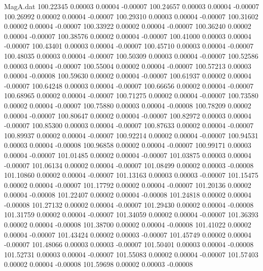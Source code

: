 \begin{filecontents}{MagA.dat}
 100.22345    0.00003    0.00004   -0.00007
 100.24657    0.00003    0.00004   -0.00007
 100.26992    0.00002    0.00004   -0.00007
 100.29310    0.00003    0.00004   -0.00007
 100.31602    0.00002    0.00004   -0.00007
 100.33922    0.00002    0.00004   -0.00007
 100.36240    0.00002    0.00004   -0.00007
 100.38576    0.00002    0.00004   -0.00007
 100.41000    0.00003    0.00004   -0.00007
 100.43401    0.00003    0.00004   -0.00007
 100.45710    0.00003    0.00004   -0.00007
 100.48035    0.00003    0.00004   -0.00007
 100.50309    0.00003    0.00004   -0.00007
 100.52586    0.00003    0.00004   -0.00007
 100.55004    0.00002    0.00004   -0.00007
 100.57213    0.00003    0.00004   -0.00008
 100.59630    0.00002    0.00004   -0.00007
 100.61937    0.00002    0.00004   -0.00007
 100.64248    0.00003    0.00004   -0.00007
 100.66656    0.00002    0.00004   -0.00007
 100.68965    0.00002    0.00004   -0.00007
 100.71275    0.00002    0.00004   -0.00007
 100.73580    0.00002    0.00004   -0.00007
 100.75880    0.00003    0.00004   -0.00008
 100.78209    0.00002    0.00004   -0.00007
 100.80647    0.00002    0.00004   -0.00007
 100.82972    0.00003    0.00004   -0.00007
 100.85300    0.00003    0.00004   -0.00007
 100.87633    0.00002    0.00004   -0.00007
 100.89937    0.00002    0.00004   -0.00007
 100.92214    0.00002    0.00004   -0.00007
 100.94531    0.00003    0.00004   -0.00008
 100.96858    0.00002    0.00004   -0.00007
 100.99171    0.00003    0.00004   -0.00007
 101.01485    0.00002    0.00004   -0.00007
 101.03875    0.00003    0.00004   -0.00007
 101.06134    0.00002    0.00004   -0.00007
 101.08499    0.00002    0.00003   -0.00008
 101.10860    0.00002    0.00004   -0.00007
 101.13163    0.00003    0.00003   -0.00007
 101.15475    0.00002    0.00004   -0.00007
 101.17792    0.00002    0.00004   -0.00007
 101.20136    0.00002    0.00004   -0.00008
 101.22407    0.00002    0.00004   -0.00008
 101.24818    0.00002    0.00004   -0.00008
 101.27132    0.00002    0.00004   -0.00007
 101.29430    0.00002    0.00004   -0.00008
 101.31759    0.00002    0.00004   -0.00007
 101.34059    0.00002    0.00004   -0.00007
 101.36393    0.00002    0.00004   -0.00008
 101.38700    0.00002    0.00004   -0.00008
 101.41022    0.00002    0.00004   -0.00007
 101.43424    0.00002    0.00003   -0.00007
 101.45749    0.00002    0.00004   -0.00007
 101.48066    0.00003    0.00003   -0.00007
 101.50401    0.00003    0.00004   -0.00008
 101.52731    0.00003    0.00004   -0.00007
 101.55083    0.00002    0.00004   -0.00007
 101.57403    0.00002    0.00004   -0.00008
 101.59698    0.00002    0.00003   -0.00008

\end{filecontents}
